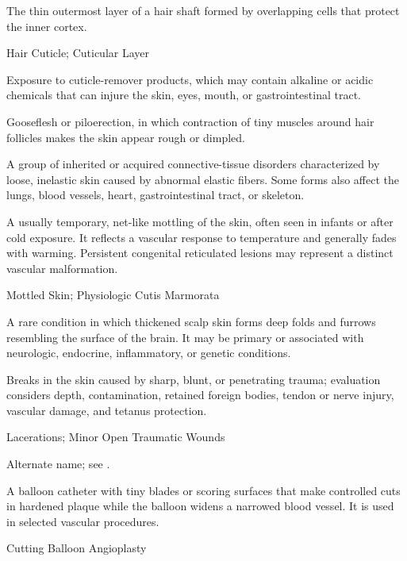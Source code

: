  The thin outermost layer of a hair shaft formed by overlapping cells that protect the inner cortex.

\synonyms
Hair Cuticle; Cuticular Layer

 Exposure to cuticle-remover products, which may contain alkaline or acidic chemicals that can injure the skin, eyes, mouth, or gastrointestinal tract.

 Gooseflesh or piloerection, in which contraction of tiny muscles around hair follicles makes the skin appear rough or dimpled.

 A group of inherited or acquired connective-tissue disorders characterized by loose, inelastic skin caused by abnormal elastic fibers. Some forms also affect the lungs, blood vessels, heart, gastrointestinal tract, or skeleton.

 A usually temporary, net-like mottling of the skin,
often seen in infants or after cold exposure. It reflects a vascular response
to temperature and generally fades with warming. Persistent congenital
reticulated lesions may represent a distinct vascular malformation.

\synonyms
Mottled Skin; Physiologic Cutis Marmorata

 A rare condition in which thickened scalp skin forms deep folds and furrows resembling the surface of the brain. It may be primary or associated with neurologic, endocrine, inflammatory, or genetic conditions.

 Breaks in the skin caused by sharp, blunt, or penetrating trauma; evaluation considers depth, contamination, retained foreign bodies, tendon or nerve injury, vascular damage, and tetanus protection.

\synonyms
Lacerations; Minor Open Traumatic Wounds


 Alternate name; see .

 A balloon catheter with tiny blades or scoring surfaces that make controlled cuts in hardened plaque while the balloon widens a narrowed blood vessel. It is used in selected vascular procedures.

\synonyms
Cutting Balloon Angioplasty

